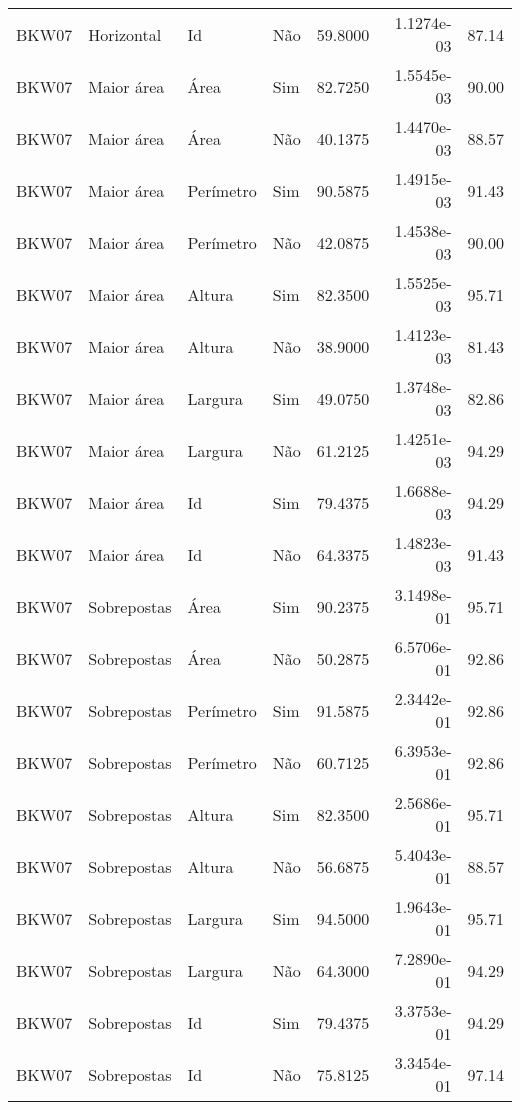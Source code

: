 \begin{tabular}{llllrrr}
BKW07     & Horizontal  & Id        & Não         & 59.8000      & 1.1274e-03 & 87.14    \\
BKW07     & Maior área  & Área      & Sim         & 82.7250      & 1.5545e-03 & 90.00    \\
BKW07     & Maior área  & Área      & Não         & 40.1375      & 1.4470e-03 & 88.57    \\
BKW07     & Maior área  & Perímetro & Sim         & 90.5875      & 1.4915e-03 & 91.43    \\
BKW07     & Maior área  & Perímetro & Não         & 42.0875      & 1.4538e-03 & 90.00    \\
BKW07     & Maior área  & Altura    & Sim         & 82.3500      & 1.5525e-03 & 95.71    \\
BKW07     & Maior área  & Altura    & Não         & 38.9000      & 1.4123e-03 & 81.43    \\
BKW07     & Maior área  & Largura   & Sim         & 49.0750      & 1.3748e-03 & 82.86    \\
BKW07     & Maior área  & Largura   & Não         & 61.2125      & 1.4251e-03 & 94.29    \\
BKW07     & Maior área  & Id        & Sim         & 79.4375      & 1.6688e-03 & 94.29    \\
BKW07     & Maior área  & Id        & Não         & 64.3375      & 1.4823e-03 & 91.43    \\
BKW07     & Sobrepostas & Área      & Sim         & 90.2375      & 3.1498e-01 & 95.71    \\
BKW07     & Sobrepostas & Área      & Não         & 50.2875      & 6.5706e-01 & 92.86    \\
BKW07     & Sobrepostas & Perímetro & Sim         & 91.5875      & 2.3442e-01 & 92.86    \\
BKW07     & Sobrepostas & Perímetro & Não         & 60.7125      & 6.3953e-01 & 92.86    \\
BKW07     & Sobrepostas & Altura    & Sim         & 82.3500      & 2.5686e-01 & 95.71    \\
BKW07     & Sobrepostas & Altura    & Não         & 56.6875      & 5.4043e-01 & 88.57    \\
BKW07     & Sobrepostas & Largura   & Sim         & 94.5000      & 1.9643e-01 & 95.71    \\
BKW07     & Sobrepostas & Largura   & Não         & 64.3000      & 7.2890e-01 & 94.29    \\
BKW07     & Sobrepostas & Id        & Sim         & 79.4375      & 3.3753e-01 & 94.29    \\
BKW07     & Sobrepostas & Id        & Não         & 75.8125      & 3.3454e-01 & 97.14    \\
\hline
\end{tabular}